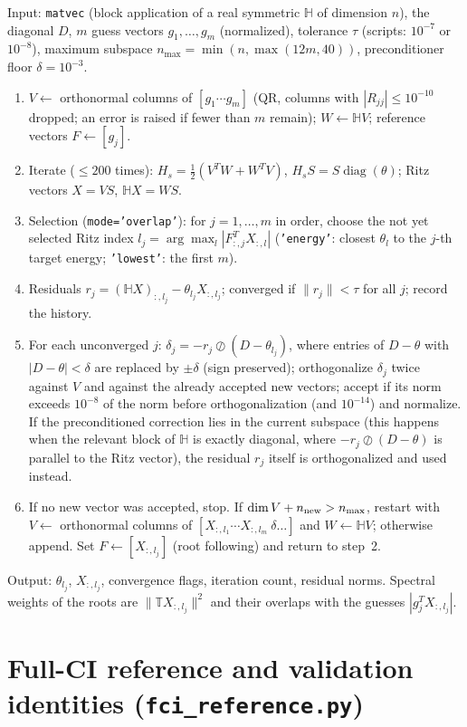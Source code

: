 \documentclass[11pt,a4paper]{article}
\newcommand{\bbH}{\mathbb{H}}
\newcommand{\bbT}{\mathbb{T}}
\newcommand{\code}[1]{\texttt{#1}}
\begin{document}
Input: \code{matvec} (block application of a real symmetric $\bbH$ of
dimension $n$), the diagonal $D$, $m$ guess vectors $g_1,\ldots,g_m$
(normalized), tolerance $\tau$ (scripts: $10^{-7}$ or $10^{-8}$), maximum
subspace $n_{\max}=\min(n,\max(12m,40))$, preconditioner floor
$\delta=10^{-3}$.
\begin{enumerate}[leftmargin=2em]
\item $V\leftarrow$ orthonormal columns of $[g_1\cdots g_m]$ (QR, columns
  with $|R_{jj}|\le10^{-10}$ dropped; an error is raised if fewer than $m$
  remain); $W\leftarrow\bbH V$; reference vectors $F\leftarrow[g_j]$.
\item Iterate ($\le200$ times): $H_s=\tfrac12(V^{T}W+W^{T}V)$,
  $H_sS=S\operatorname{diag}(\theta)$; Ritz vectors $X=VS$, $\bbH X=WS$.
\item Selection (\code{mode='overlap'}): for $j=1,\ldots,m$ in order, choose
  the not yet selected Ritz index $l_j=\arg\max_l|F_{:,j}^{T}X_{:,l}|$
  (\code{'energy'}: closest $\theta_l$ to the $j$-th target energy;
  \code{'lowest'}: the first $m$).
\item Residuals $r_j=(\bbH X)_{:,l_j}-\theta_{l_j}X_{:,l_j}$; converged if
  $\|r_j\|<\tau$ for all $j$; record the history.
\item For each unconverged $j$: $\delta_j=-r_j\oslash(D-\theta_{l_j})$, where
  entries of $D-\theta$ with $|D-\theta|<\delta$ are replaced by
  $\pm\delta$ (sign preserved); orthogonalize $\delta_j$ twice against $V$
  and against the already accepted new vectors; accept if its norm exceeds
  $10^{-8}$ of the norm before orthogonalization (and $10^{-14}$) and
  normalize.  If the preconditioned correction lies in the current subspace
  (this happens when the relevant block of $\bbH$ is exactly diagonal, where
  $-r_j\oslash(D-\theta)$ is parallel to the Ritz vector), the residual
  $r_j$ itself is orthogonalized and used instead.
\item If no new vector was accepted, stop.  If $\dim V+n_{\rm new}>n_{\max}$,
  restart with $V\leftarrow$ orthonormal columns of $[X_{:,l_1}\cdots X_{:,l_m}\ \delta\ldots]$
  and $W\leftarrow\bbH V$; otherwise append.  Set
  $F\leftarrow[X_{:,l_j}]$ (root following) and return to step~2.
\end{enumerate}
Output: $\theta_{l_j}$, $X_{:,l_j}$, convergence flags, iteration count,
residual norms.  Spectral weights of the roots are $\|\bbT X_{:,l_j}\|^2$ and
their overlaps with the guesses $|g_j^{T}X_{:,l_j}|$.

\section{Full-CI reference and validation identities (\code{fci\_reference.py})}
\label{sec:fci}
\end{document}
